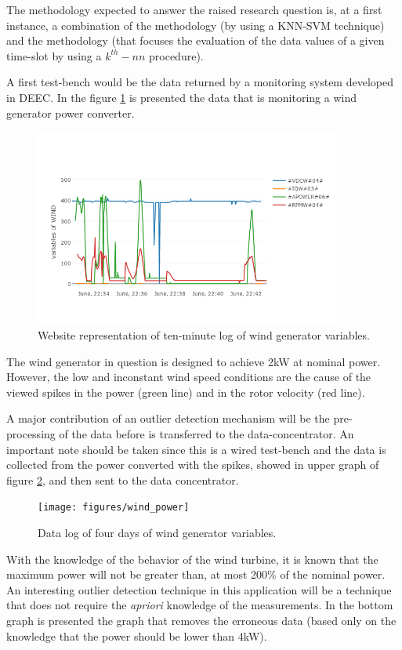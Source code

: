 The methodology expected to answer the raised research question is, at a first instance, a combination of the \cite{class:xu:2012} methodology (by using a KNN-SVM technique) and the \cite{nn:abid:2016} methodology (that focuses the evaluation of the data values of a given time-slot by using a $k^{th}-nn$ procedure).

A first test-bench would be the data returned by a monitoring system developed in DEEC. In the figure \ref{fig:website} is presented the data that is monitoring a wind generator power converter.
\begin{figure}[h!]
	\centering
	\includegraphics[width=0.90\textwidth,keepaspectratio]{figures/website}
	\caption{Website representation of ten-minute log of wind generator variables. }
	\label{fig:website}
\end{figure}

The wind generator in question is designed to achieve 2kW at nominal power. However, the low and inconstant wind speed conditions are the cause of the viewed spikes in the power (green line) and in the rotor velocity (red line).

A major contribution of an outlier detection mechanism will be the pre-processing of the data before is transferred to the data-concentrator. An important note should be taken since this is a wired test-bench and the data is collected from the power converted with the spikes, showed in upper graph of figure \ref{fig:wind_power}, and then sent to the data concentrator.

\begin{figure}[h!]
	\centering
	\texttt{[image: figures/wind\_power]}
	\caption{Data log of four days of wind generator variables. }
	\label{fig:wind_power}
\end{figure}

With the knowledge of the behavior of the wind turbine, it is known that the maximum power will not be greater than, at most 200\% of the nominal power. An interesting outlier detection technique in this application will be a technique that does not require the \textit{apriori} knowledge of the measurements. In the bottom graph is presented the graph that removes the erroneous data (based only on the knowledge that the power should be lower than 4kW).


